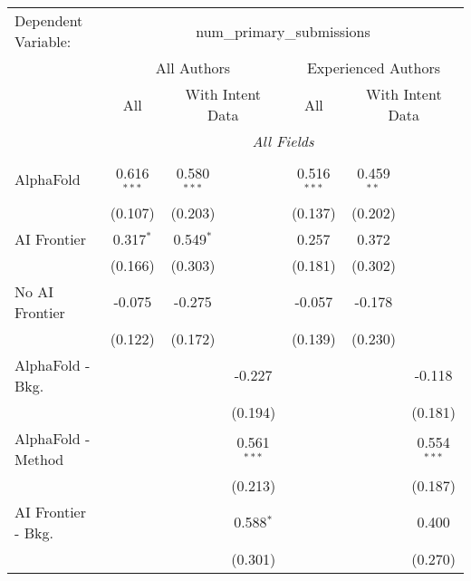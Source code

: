 \begingroup
\centering
\begin{tabular}{lcccccc}
   \tabularnewline \midrule \midrule
   Dependent Variable: & \multicolumn{6}{c}{num\_primary\_submissions}\\
 & \multicolumn{3}{c}{All Authors} & \multicolumn{3}{c}{Experienced Authors} \\
\cmidrule(lr){2-4} \cmidrule(lr){5-7}
 & \multicolumn{1}{c}{All} & \multicolumn{2}{c}{With Intent Data} & \multicolumn{1}{c}{All} & \multicolumn{2}{c}{With Intent Data} \\
\cmidrule(lr){2-2} \cmidrule(lr){3-4} \cmidrule(lr){5-5} \cmidrule(lr){6-7}
 & \multicolumn{6}{c}{\textit{All Fields}} \\ \\
   AlphaFold               & 0.616$^{***}$ & 0.580$^{***}$ &               & 0.516$^{***}$ & 0.459$^{**}$ &   \\   
                           & (0.107)       & (0.203)       &               & (0.137)       & (0.202)      &   \\   
   AI Frontier             & 0.317$^{*}$   & 0.549$^{*}$   &               & 0.257         & 0.372        &   \\   
                           & (0.166)       & (0.303)       &               & (0.181)       & (0.302)      &   \\   
   No AI Frontier          & -0.075        & -0.275        &               & -0.057        & -0.178       &   \\   
                           & (0.122)       & (0.172)       &               & (0.139)       & (0.230)      &   \\   
   AlphaFold - Bkg.        &               &               & -0.227        &               &              & -0.118\\   
                           &               &               & (0.194)       &               &              & (0.181)\\   
   AlphaFold - Method      &               &               & 0.561$^{***}$ &               &              & 0.554$^{***}$\\   
                           &               &               & (0.213)       &               &              & (0.187)\\   
   AI Frontier - Bkg.      &               &               & 0.588$^{*}$   &               &              & 0.400\\   
                           &               &               & (0.301)       &               &              & (0.270)\\   

\end{tabular}
